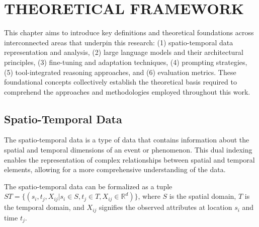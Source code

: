 \chapter{THEORETICAL FRAMEWORK}

This chapter aims to introduce key definitions and theoretical foundations across interconnected areas that underpin this research: (1) spatio-temporal data representation and analysis, (2) large language models and their architectural principles, (3) fine-tuning and adaptation techniques, (4) prompting strategies, (5) tool-integrated reasoning approaches, and (6) evaluation metrics. These foundational concepts collectively establish the theoretical basis required to comprehend the approaches and methodologies employed throughout this work.

\section{Spatio-Temporal Data}

The spatio-temporal data is a type of data that contains information about the spatial and temporal dimensions of an event or phenomenon. 
This dual indexing enables the representation of complex relationships between spatial and temporal elements, allowing for a more comprehensive understanding of the data.

The spatio-temporal data can be formalized as a tuple $ST = \{ (s_i, t_j, X_{ij} | s_i \in S , t_j \in T , X_{ij} \in \mathbb{R}^d )\}$, where $S$ is the spatial domain, $T$ is the temporal domain, and $X_{ij}$ signifies the observed attributes at location $s_i$ and time $t_j$.






